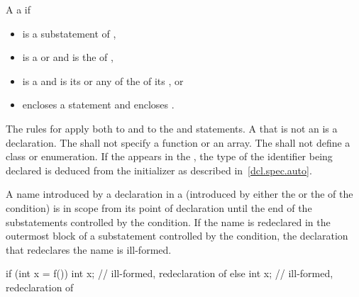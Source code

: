 \pnum
A   
a   if
\begin{itemize}
\item
   is a substatement of ,
\item
   is a  or
   and
   is the  of ,
\item
   is a  and 
  is its  or
  any of the  of
  its , or
\item
   encloses a statement  and  encloses .
\end{itemize}

\pnum
{}%
The rules for  apply both to
 and to the  and 
statements.
A  that is not an  is a
declaration.
The  shall not
specify a function or an array. The  shall not
define a class or enumeration. If the   appears in
the ,
the type of the identifier being declared is deduced from the initializer as described in~\ref{dcl.spec.auto}.

\pnum
{}%
%
A name introduced by a declaration in a 
(introduced by either the  or the
 of the condition) is in scope from its point of
declaration until the end of the substatements controlled by the
condition. If the name is redeclared in the outermost block of a
substatement controlled by the condition, the declaration that
redeclares the name is ill-formed.
\begin{example}

\begin{codeblock}
if (int x = f()) {
  int x;            // ill-formed, redeclaration of 
}
else {
  int x;            // ill-formed, redeclaration of 
}
\end{codeblock}
\end{example}

